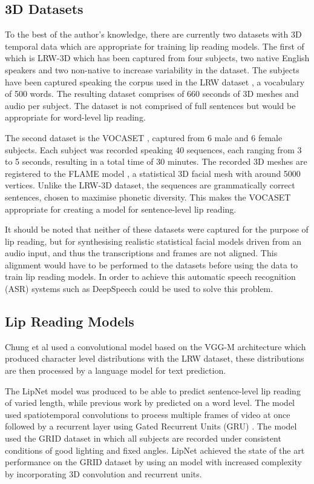 \documentclass[12pt]{article}
\begin{document}
\subsection{3D Datasets} \label{3D Datasets}
To the best of the author's knowledge, there are currently two datasets with 3D temporal data which are appropriate for training lip reading models.
The first of which is LRW-3D \cite{Tzirakis2019} which has been captured from four subjects, two native English speakers and two non-native to increase variability in the dataset.
The subjects have been captured speaking the corpus used in the LRW dataset \cite{Chung2016}, a vocabulary of 500 words.
The resulting dataset comprises of 660 seconds of 3D meshes and audio per subject.
The dataset is not comprised of full sentences but would be appropriate for word-level lip reading.

The second dataset is the VOCASET \cite{Cudeiro2019}, captured from 6 male and 6 female subjects.
Each subject was recorded speaking 40 sequences, each ranging from 3 to 5 seconds, resulting in a total time of 30 minutes.
The recorded 3D meshes are registered to the FLAME model \cite{Li2017}, a statistical 3D facial mesh with around 5000 vertices.
Unlike the LRW-3D dataset, the sequences are grammatically correct sentences, chosen to maximise phonetic diversity.
This makes the VOCASET appropriate for creating a model for sentence-level lip reading.

It should be noted that neither of these datasets were captured for the purpose of lip reading, but for synthesising realistic statistical facial models driven from an audio input, and thus the transcriptions and frames are not aligned.
This alignment would have to be performed to the datasets before using the data to train lip reading models.
In order to achieve this automatic speech recognition (ASR) systems such as DeepSpeech \cite{Hannun2014} could be used to solve this problem.

\subsection{Lip Reading Models}
Chung et al \cite{Chung2016} used a convolutional model based on the VGG-M architecture which produced character level distributions with the LRW dataset, these distributions are then processed by a language model for text prediction.

The LipNet model \cite{Assael2016} was produced to be able to predict sentence-level lip reading of varied length, while previous work by \cite{Chung2016} predicted on a word level.
The model used spatiotemporal convolutions to process multiple frames of video at once followed by a recurrent layer using Gated Recurrent Units (GRU) \cite{Cho2014}.
The model used the GRID dataset \cite{Cooke2006} in which all subjects are recorded under consistent conditions of good lighting and fixed angles.
LipNet achieved the state of the art performance on the GRID dataset by using an model with increased complexity by incorporating 3D convolution and recurrent units.
\end{document}
